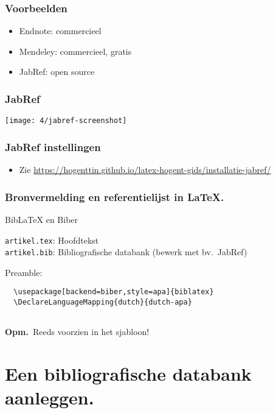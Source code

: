 \documentclass[aspectratio=169]{beamer}
\begin{document}
\begin{frame}
  \frametitle{Voorbeelden}

  \begin{itemize}
    \item Endnote: commercieel
    \item Mendeley: commercieel, gratis
    \item JabRef: open source
  \end{itemize}

\end{frame}

\begin{frame}[plain]
  \frametitle{JabRef}

  \centering
  \texttt{[image: 4/jabref-screenshot]}

\end{frame}

\begin{frame}
  \frametitle{JabRef instellingen}

  \begin{itemize}
    \item Zie \url{https://hogenttin.github.io/latex-hogent-gids/installatie-jabref/}
  \end{itemize}

\end{frame}

\begin{frame}[fragile]
  \frametitle{Bronvermelding en referentielijst in {\LaTeX}.}

  Bib{\LaTeX} en Biber

  \bigskip

  \verb|artikel.tex|: Hoofdtekst\\
  \verb|artikel.bib|: Bibliografische databank (bewerk met bv.~JabRef)

  \bigskip

  Preamble:

  \begin{verbatim}
  \usepackage[backend=biber,style=apa]{biblatex}
  \DeclareLanguageMapping{dutch}{dutch-apa}
  
  \end{verbatim}

  \textbf{Opm.}\ Reeds voorzien in het sjabloon!

\end{frame}

\section{Een bibliografische databank aanleggen.}
\end{document}

